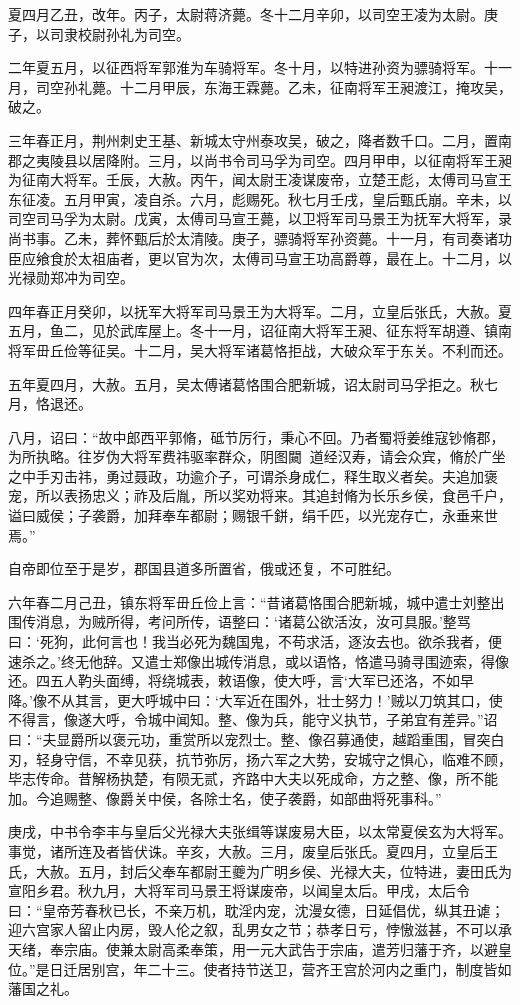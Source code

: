 \documentclass[12pt,UTF8]{ctexbook}
\begin{document}
夏四月乙丑，改年。丙子，太尉蒋济薨。冬十二月辛卯，以司空王凌为太尉。庚子，以司隶校尉孙礼为司空。

二年夏五月，以征西将军郭淮为车骑将军。冬十月，以特进孙资为骠骑将军。十一月，司空孙礼薨。十二月甲辰，东海王霖薨。乙未，征南将军王昶渡江，掩攻吴，破之。

三年春正月，荆州刺史王基、新城太守州泰攻吴，破之，降者数千口。二月，置南郡之夷陵县以居降附。三月，以尚书令司马孚为司空。四月甲申，以征南将军王昶为征南大将军。壬辰，大赦。丙午，闻太尉王凌谋废帝，立楚王彪，太傅司马宣王东征凌。五月甲寅，凌自杀。六月，彪赐死。秋七月壬戌，皇后甄氏崩。辛未，以司空司马孚为太尉。戊寅，太傅司马宣王薨，以卫将军司马景王为抚军大将军，录尚书事。乙未，葬怀甄后於太清陵。庚子，骠骑将军孙资薨。十一月，有司奏诸功臣应飨食於太祖庙者，更以官为次，太傅司马宣王功高爵尊，最在上。十二月，以光禄勋郑冲为司空。

四年春正月癸卯，以抚军大将军司马景王为大将军。二月，立皇后张氏，大赦。夏五月，鱼二，见於武库屋上。冬十一月，诏征南大将军王昶、征东将军胡遵、镇南将军毌丘俭等征吴。十二月，吴大将军诸葛恪拒战，大破众军于东关。不利而还。

五年夏四月，大赦。五月，吴太傅诸葛恪围合肥新城，诏太尉司马孚拒之。秋七月，恪退还。

八月，诏曰：“故中郎西平郭脩，砥节厉行，秉心不回。乃者蜀将姜维寇钞脩郡，为所执略。往岁伪大将军费祎驱率群众，阴图闚，道经汉寿，请会众宾，脩於广坐之中手刃击祎，勇过聂政，功逾介子，可谓杀身成仁，释生取义者矣。夫追加褒宠，所以表扬忠义；祚及后胤，所以奖劝将来。其追封脩为长乐乡侯，食邑千户，谥曰威侯；子袭爵，加拜奉车都尉；赐银千鉼，绢千匹，以光宠存亡，永垂来世焉。”

自帝即位至于是岁，郡国县道多所置省，俄或还复，不可胜纪。

六年春二月己丑，镇东将军毌丘俭上言：“昔诸葛恪围合肥新城，城中遣士刘整出围传消息，为贼所得，考问所传，语整曰：‘诸葛公欲活汝，汝可具服。’整骂曰：‘死狗，此何言也！我当必死为魏国鬼，不苟求活，逐汝去也。欲杀我者，便速杀之。’终无他辞。又遣士郑像出城传消息，或以语恪，恪遣马骑寻围迹索，得像还。四五人靮头面缚，将绕城表，敕语像，使大呼，言‘大军已还洛，不如早降。’像不从其言，更大呼城中曰：‘大军近在围外，壮士努力！’贼以刀筑其口，使不得言，像遂大呼，令城中闻知。整、像为兵，能守义执节，子弟宜有差异。”诏曰：“夫显爵所以褒元功，重赏所以宠烈士。整、像召募通使，越蹈重围，冒突白刃，轻身守信，不幸见获，抗节弥厉，扬六军之大势，安城守之惧心，临难不顾，毕志传命。昔解杨执楚，有陨无贰，齐路中大夫以死成命，方之整、像，所不能加。今追赐整、像爵关中侯，各除士名，使子袭爵，如部曲将死事科。”

庚戌，中书令李丰与皇后父光禄大夫张缉等谋废易大臣，以太常夏侯玄为大将军。事觉，诸所连及者皆伏诛。辛亥，大赦。三月，废皇后张氏。夏四月，立皇后王氏，大赦。五月，封后父奉车都尉王夔为广明乡侯、光禄大夫，位特进，妻田氏为宣阳乡君。秋九月，大将军司马景王将谋废帝，以闻皇太后。甲戌，太后令曰：“皇帝芳春秋已长，不亲万机，耽淫内宠，沈漫女德，日延倡优，纵其丑谑；迎六宫家人留止内房，毁人伦之叙，乱男女之节；恭孝日亏，悖慠滋甚，不可以承天绪，奉宗庙。使兼太尉高柔奉策，用一元大武告于宗庙，遣芳归藩于齐，以避皇位。”是日迁居别宫，年二十三。使者持节送卫，营齐王宫於河内之重门，制度皆如藩国之礼。
\end{document}
